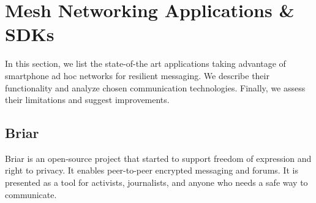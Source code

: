 \documentclass[conference,compsoc]{IEEEtran}
\begin{document}






\section{Mesh Networking Applications \& SDKs} \label{applications}

In this section, we list the state-of-the art applications taking advantage of smartphone ad hoc networks for resilient messaging. We describe their functionality and analyze chosen communication technologies. Finally, we assess their limitations and suggest improvements.


\subsection{Briar}

Briar \cite{briar_gplay} is an open-source project that started to support freedom of expression and right to privacy. It enables peer-to-peer encrypted messaging and forums. It is presented as a tool for activists, journalists, and anyone who needs a safe way to communicate.
\end{document}
